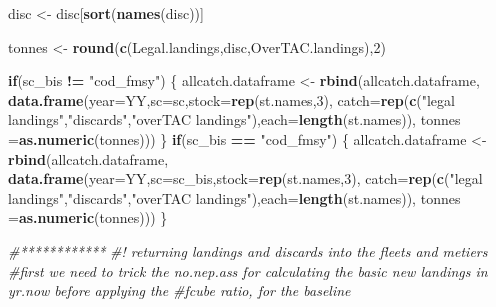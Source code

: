 \documentclass[
]{article}
\newenvironment{Shaded}{\begin{snugshade}}{\end{snugshade}}
\newcommand{\CommentTok}[1]{\textcolor[rgb]{0.56,0.35,0.01}{\textit{#1}}}
\newcommand{\ControlFlowTok}[1]{\textcolor[rgb]{0.13,0.29,0.53}{\textbf{#1}}}
\newcommand{\DataTypeTok}[1]{\textcolor[rgb]{0.13,0.29,0.53}{#1}}
\newcommand{\DecValTok}[1]{\textcolor[rgb]{0.00,0.00,0.81}{#1}}
\newcommand{\KeywordTok}[1]{\textcolor[rgb]{0.13,0.29,0.53}{\textbf{#1}}}
\newcommand{\NormalTok}[1]{#1}
\newcommand{\OperatorTok}[1]{\textcolor[rgb]{0.81,0.36,0.00}{\textbf{#1}}}
\newcommand{\StringTok}[1]{\textcolor[rgb]{0.31,0.60,0.02}{#1}}
\begin{document}
\begin{Shaded}
\begin{Highlighting}[]
{{{{\NormalTok{            disc <-}\StringTok{ }\NormalTok{disc[}\KeywordTok{sort}\NormalTok{(}\KeywordTok{names}\NormalTok{(disc))]}

\NormalTok{            tonnes <-}\StringTok{ }\KeywordTok{round}\NormalTok{(}\KeywordTok{c}\NormalTok{(Legal.landings,disc,OverTAC.landings),}\DecValTok{2}\NormalTok{)}

            \ControlFlowTok{if}\NormalTok{(sc_bis }\OperatorTok{!=}\StringTok{ "cod_fmsy"}\NormalTok{) \{}
\NormalTok{            allcatch.dataframe <-}\StringTok{ }\KeywordTok{rbind}\NormalTok{(allcatch.dataframe,}
                                        \KeywordTok{data.frame}\NormalTok{(}\DataTypeTok{year=}\NormalTok{YY,}\DataTypeTok{sc=}\NormalTok{sc,}\DataTypeTok{stock=}\KeywordTok{rep}\NormalTok{(st.names,}\DecValTok{3}\NormalTok{),}
                                                   \DataTypeTok{catch=}\KeywordTok{rep}\NormalTok{(}\KeywordTok{c}\NormalTok{(}\StringTok{"legal landings"}\NormalTok{,}\StringTok{"discards"}\NormalTok{,}\StringTok{"overTAC landings"}\NormalTok{),}\DataTypeTok{each=}\KeywordTok{length}\NormalTok{(st.names)),}
                                                   \DataTypeTok{tonnes =}\KeywordTok{as.numeric}\NormalTok{(tonnes)))}
\NormalTok{            \}}
            \ControlFlowTok{if}\NormalTok{(sc_bis }\OperatorTok{==}\StringTok{ "cod_fmsy"}\NormalTok{) \{}
\NormalTok{            allcatch.dataframe <-}\StringTok{ }\KeywordTok{rbind}\NormalTok{(allcatch.dataframe,}
                                        \KeywordTok{data.frame}\NormalTok{(}\DataTypeTok{year=}\NormalTok{YY,}\DataTypeTok{sc=}\NormalTok{sc_bis,}\DataTypeTok{stock=}\KeywordTok{rep}\NormalTok{(st.names,}\DecValTok{3}\NormalTok{),}
                                                   \DataTypeTok{catch=}\KeywordTok{rep}\NormalTok{(}\KeywordTok{c}\NormalTok{(}\StringTok{"legal landings"}\NormalTok{,}\StringTok{"discards"}\NormalTok{,}\StringTok{"overTAC landings"}\NormalTok{),}\DataTypeTok{each=}\KeywordTok{length}\NormalTok{(st.names)),}
                                                   \DataTypeTok{tonnes =}\KeywordTok{as.numeric}\NormalTok{(tonnes)))}
\NormalTok{            \}}

        \CommentTok{#************}
        \CommentTok{#! returning landings and discards into the fleets and metiers}
        \CommentTok{#first we need to trick the no.nep.ass for calculating the basic new landings in yr.now before applying the}
        \CommentTok{#fcube ratio, for the baseline}

}}}}
\end{Highlighting}
\end{Shaded}
\end{document}
